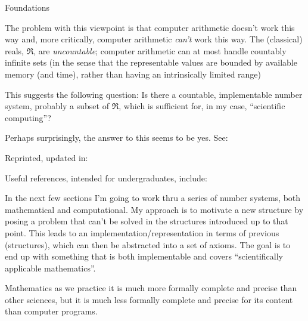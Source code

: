 \documentclass[12pt]{PalisadesLakesBook}
\begin{document}
\begin{plSection}{Foundations}

The problem with this viewpoint is that computer arithmetic
doesn't work this way
and, more critically, computer arithmetic \emph{can't} work
this way.
The (classical) reals, $\Re$, are \emph{uncountable};
computer arithmetic can at most handle countably infinite sets
(in the sense that the representable values are 
bounded by available memory (and time),
rather than having an intrinsically limited range)

This suggests the following question:
Is there a countable, implementable number system,
probably a subset of $\Re$,
which is sufficient for, in my case,
``scientific computing''?

Perhaps surprisingly, the answer to this seems to be yes.
See: 



Reprinted, updated in:




Useful references, intended for undergraduates, include:
 



In the next few sections I'm going to work thru a series
of number systems, both mathematical and computational.
My approach is to motivate a new structure
by posing a problem that can't be solved in the structures
introduced up to that point.
This leads to an implementation/representation
in terms of previous (structures),
which can then be abstracted into a set of axioms.
The goal is to end up with something that is both
implementable and covers ``scientifically applicable mathematics''.

\begin{plQuote}
{}{}%
{Mathematics as we practice it is much more formally 
complete and precise than
other sciences, but it is much less formally complete and precise 
for its content than computer programs.
}
\end{plQuote}


\end{plSection}
\end{document}
